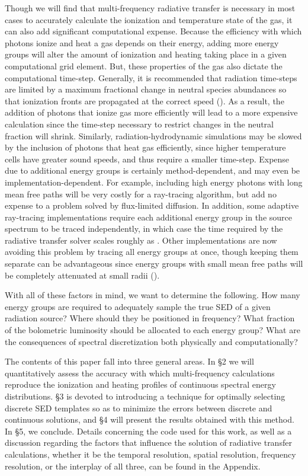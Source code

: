 \documentclass[preprint2]{aastex}              %
\begin{document}
Though we will find that multi-frequency radiative transfer is necessary in most cases to accurately calculate the ionization and temperature state of the gas, it can also add significant computational expense.  Because the efficiency with which photons ionize and heat a gas depends on their energy, adding more energy groups will alter the amount of ionization and heating taking place in a given computational grid element.  But, these properties of the gas also dictate the computational time-step.  Generally, it is recommended that radiation time-steps are limited by a maximum fractional change in neutral species abundances so that ionization fronts are propagated at the correct speed (\cite{Shapiro2004}).  As a result, the addition of photons that ionize gas more efficiently will lead to a more expensive calculation since the time-step necessary to restrict changes in the neutral fraction will shrink.  Similarly, radiation-hydrodynamic simulations may be slowed by the inclusion of photons that heat gas efficiently, since higher temperature cells have greater sound speeds, and thus require a smaller time-step.  Expense due to additional energy groups is certainly method-dependent, and may even be implementation-dependent.  For example, including high energy photons with long mean free paths will be very costly for a ray-tracing algorithm, but add no expense to a problem solved by flux-limited diffusion.  In addition, some adaptive ray-tracing implementations require each additional energy group in the source spectrum to be traced independently, in which case the time required by the radiative transfer solver scales roughly as \nnu.  Other implementations are now avoiding this problem by tracing all energy groups at once, though keeping them separate can be advantageous since energy groups with small mean free paths will be completely attenuated at small radii (\cite{Wise2011}).

With all of these factors in mind, we want to determine the following.  How many energy groups are required to adequately sample the true SED of a given radiation source?  Where should they be positioned in frequency?  What fraction of the bolometric luminosity should be allocated to each energy group?  What are the consequences of spectral discretization both physically and computationally?  

The contents of this paper fall into three general areas.  In \S2 we will quantitatively assess the accuracy with which multi-frequency calculations reproduce the ionization and heating profiles of continuous spectral energy distributions.  \S3 is devoted to introducing a technique for optimally selecting discrete SED templates so as to minimize the errors between discrete and continuous solutions, and \S4 will present the results obtained with this method.  In \S5, we conclude.  Details concerning the code used for this work, as well as a discussion regarding the factors that influence the solution of radiative transfer calculations, whether it be the temporal resolution, spatial resolution, frequency resolution, or the interplay of all three, can be found in the Appendix.
\end{document}
